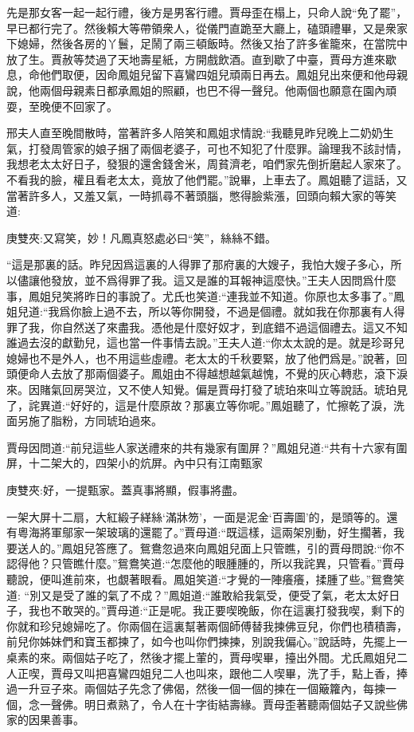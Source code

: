 \begin{parag}
    先是那女客一起一起行禮，後方是男客行禮。賈母歪在榻上，只命人說“免了罷”，早已都行完了。然後賴大等帶領衆人，從儀門直跪至大廳上，磕頭禮畢，又是衆家下媳婦，然後各房的丫鬟，足鬧了兩三頓飯時。然後又抬了許多雀籠來，在當院中放了生。賈赦等焚過了天地壽星紙，方開戲飲酒。直到歇了中臺，賈母方進來歇息，命他們取便，因命鳳姐兒留下喜鸞四姐兒頑兩日再去。鳳姐兒出來便和他母親說，他兩個母親素日都承鳳姐的照顧，也巴不得一聲兒。他兩個也願意在園內頑耍，至晚便不回家了。
\end{parag}


\begin{parag}
    邢夫人直至晚間散時，當著許多人陪笑和鳳姐求情說:“我聽見昨兒晚上二奶奶生氣，打發周管家的娘子捆了兩個老婆子，可也不知犯了什麼罪。論理我不該討情，我想老太太好日子，發狠的還舍錢舍米，周貧濟老，咱們家先倒折磨起人家來了。不看我的臉，權且看老太太，竟放了他們罷。”說畢，上車去了。鳳姐聽了這話，又當著許多人，又羞又氣，一時抓尋不著頭腦，憋得臉紫漲，回頭向賴大家的等笑道:\begin{note}庚雙夾:又寫笑，妙！凡鳳真怒處必曰“笑”，絲絲不錯。\end{note}“這是那裏的話。昨兒因爲這裏的人得罪了那府裏的大嫂子，我怕大嫂子多心，所以儘讓他發放，並不爲得罪了我。這又是誰的耳報神這麼快。”王夫人因問爲什麼事，鳳姐兒笑將昨日的事說了。尤氏也笑道:“連我並不知道。你原也太多事了。”鳳姐兒道:“我爲你臉上過不去，所以等你開發，不過是個禮。就如我在你那裏有人得罪了我，你自然送了來盡我。憑他是什麼好奴才，到底錯不過這個禮去。這又不知誰過去沒的獻勤兒，這也當一件事情去說。”王夫人道:“你太太說的是。就是珍哥兒媳婦也不是外人，也不用這些虛禮。老太太的千秋要緊，放了他們爲是。”說著，回頭便命人去放了那兩個婆子。鳳姐由不得越想越氣越愧，不覺的灰心轉悲，滾下淚來。因賭氣回房哭泣，又不使人知覺。偏是賈母打發了琥珀來叫立等說話。琥珀見了，詫異道:“好好的，這是什麼原故？那裏立等你呢。”鳳姐聽了，忙擦乾了淚，洗面另施了脂粉，方同琥珀過來。
\end{parag}


\begin{parag}
    賈母因問道:“前兒這些人家送禮來的共有幾家有圍屏？”鳳姐兒道:“共有十六家有圍屏，十二架大的，四架小的炕屏。內中只有江南甄家\begin{note}庚雙夾:好，一提甄家。蓋真事將顯，假事將盡。\end{note}一架大屏十二扇，大紅緞子緙絲‘滿牀笏’，一面是泥金‘百壽圖’的，是頭等的。還有粵海將軍鄔家一架玻璃的還罷了。”賈母道:“既這樣，這兩架別動，好生擱著，我要送人的。”鳳姐兒答應了。鴛鴦忽過來向鳳姐兒面上只管瞧，引的賈母問說:“你不認得他？只管瞧什麼。”鴛鴦笑道:“怎麼他的眼腫腫的，所以我詫異，只管看。”賈母聽說，便叫進前來，也覷著眼看。鳳姐笑道:“才覺的一陣癢癢，揉腫了些。”鴛鴦笑道: “別又是受了誰的氣了不成？”鳳姐道:“誰敢給我氣受，便受了氣，老太太好日子，我也不敢哭的。”賈母道:“正是呢。我正要喫晚飯，你在這裏打發我喫，剩下的你就和珍兒媳婦吃了。你兩個在這裏幫著兩個師傅替我揀佛豆兒，你們也積積壽，前兒你姊妹們和寶玉都揀了，如今也叫你們揀揀，別說我偏心。”說話時，先擺上一桌素的來。兩個姑子吃了，然後才擺上葷的，賈母喫畢，擡出外間。尤氏鳳姐兒二人正喫，賈母又叫把喜鸞四姐兒二人也叫來，跟他二人喫畢，洗了手，點上香，捧過一升豆子來。兩個姑子先念了佛偈，然後一個一個的揀在一個簸籮內，每揀一個，念一聲佛。明日煮熟了，令人在十字街結壽緣。賈母歪著聽兩個姑子又說些佛家的因果善事。
\end{parag}


